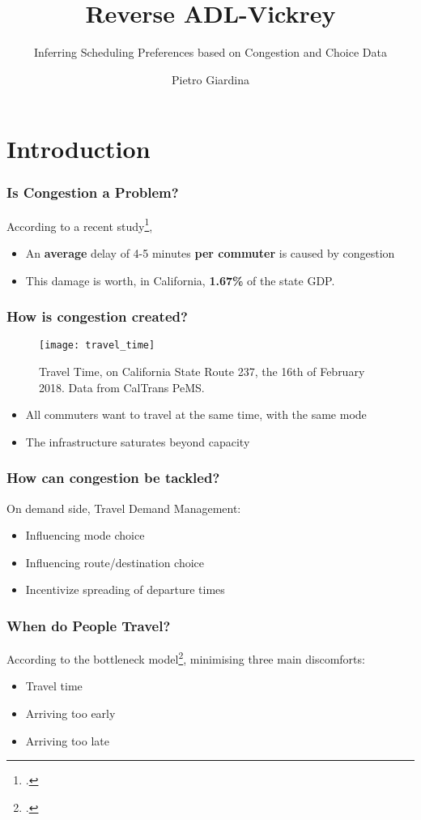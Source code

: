 \documentclass[hyperref={pdfpagelabels=false}]{beamer}
\title{Reverse ADL-Vickrey}
\subtitle{Inferring Scheduling Preferences based on Congestion and Choice Data}
\author{Pietro Giardina}
\begin{document}
\section{Introduction} %
\begin{frame}
  \tableofcontents[currentsection]
\end{frame}

\begin{frame}
  \frametitle{Is Congestion a Problem?}
  According to a recent study\footcite{kim2022congestion},
  \begin{itemize}
  \item An \textbf{average} delay of 4-5 minutes \textbf{per commuter} is caused by congestion
  \item This damage is worth, in California, \textbf{1.67\%} of the state GDP.
  \end{itemize}
\end{frame}

\begin{frame}
  \frametitle{How is congestion created?}
  \begin{figure}
    \centering
    \texttt{[image: travel\_time]}
    \caption{Travel Time, on California State Route 237, the 16th of February 2018.
    Data from CalTrans PeMS.}
    \label{fig:tt}
  \end{figure}
  \begin{itemize}
  \item All commuters want to travel at the same time, with the same mode
  \item<2-> The infrastructure saturates beyond capacity
  \end{itemize}
\end{frame}

\begin{frame}
  \frametitle{How can congestion be tackled?}
  On demand side, Travel Demand Management:
  \begin{itemize}
  \item<2-> Influencing mode choice
  \item<3-> Influencing route/destination choice
  \item<4-> Incentivize spreading of departure times
  \end{itemize}

\end{frame}

\begin{frame}
  \frametitle{When do People Travel?}
  According to the bottleneck model\footcite{f32d6720-dd02-34b7-a4ba-c4c21193efe7, d0907f84-e14a-3d98-ad20-759f41491d6e},
  minimising three main discomforts:
  \begin{itemize}
  \item Travel time
  \item Arriving too early
  \item Arriving too late
  \end{itemize}

\end{frame}
\end{document}
